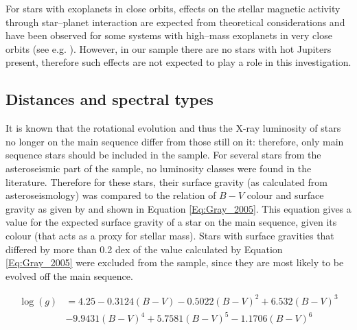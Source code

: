 For stars with exoplanets in close orbits, effects on the stellar magnetic activity through star--planet interaction are expected from theoretical considerations \citep{Cuntz_etal_2000} and have been observed for some systems with high--mass exoplanets in very close orbits (see e.g. \citealt{Poppenhaeger_Wolk_2014,Pillitteri_etal_2015}). However, in our sample there are no stars with hot Jupiters present, therefore such effects are not expected to play a role in this investigation.

\subsection{Distances and spectral types}
\label{Section_Xray_distances_and_spectype}
It is known that the rotational evolution and thus the X-ray luminosity of stars no longer on the main sequence differ from those still on it: therefore, only main sequence stars should be included in the sample. For several stars from the asteroseismic part of the sample, no luminosity classes were found in the literature. Therefore for these stars, their surface gravity (as calculated from asteroseismology) was compared to the relation of $B-V$ colour and surface gravity as given by \citet{Gray_2005} and shown in Equation \ref{Eq:Gray_2005}. This equation gives a value for the expected surface gravity of a star on the main sequence, given its colour (that acts as a proxy for stellar mass). Stars with surface gravities that differed by more than 0.2 dex of the value calculated by Equation \ref{Eq:Gray_2005} were excluded from the sample, since they are most likely to be evolved off the main sequence.

\begin{equation}
    \begin{aligned}
    \log(g) & = 4.25 - 0.3124(B-V) - 0.5022(B-V)^{2} + 6.532(B-V)^{3} \\
    &- 9.9431(B-V)^{4} + 5.7581(B-V)^{5} - 1.1706(B-V)^{6}
    \label{Eq:Gray_2005}
    \end{aligned}
\end{equation}

